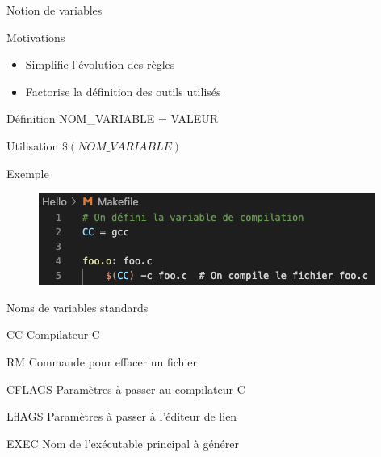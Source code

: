 \documentclass[10pt,xcolor=dvipsnames]{beamer}
\begin{document}
\begin{frame}{Notion de variables}
    \begin{exampleblock}{Motivations}
    \begin{itemize}
        \item Simplifie l'évolution des règles
        \item Factorise la définition des outils utilisés
    \end{itemize}
    \end{exampleblock}
    \begin{exampleblock}{Définition}
    NOM\_VARIABLE = VALEUR
    \end{exampleblock}
    \begin{exampleblock}{Utilisation}
    $\$(NOM\_VARIABLE)$
    \end{exampleblock}
    \begin{exampleblock}{Exemple}
    \begin{figure}
        \centering
        \includegraphics[scale=0.6]{figures/makefile_variable.png}
        \label{fig:my_label}
    \end{figure}
    \end{exampleblock}
\end{frame}

\begin{frame}{Noms de variables standards}
    \begin{exampleblock}{CC}
    Compilateur C
    \end{exampleblock}
    \begin{exampleblock}{RM}
    Commande pour effacer un fichier
    \end{exampleblock}
    \begin{exampleblock}{CFLAGS}
    Paramètres à passer au compilateur C
    \end{exampleblock}
    \begin{exampleblock}{LflAGS}
    Paramètres à passer à l'éditeur de lien
    \end{exampleblock}
    \begin{exampleblock}{EXEC}
    Nom de l'exécutable principal à générer
    \end{exampleblock}
\end{frame}
\end{document}
